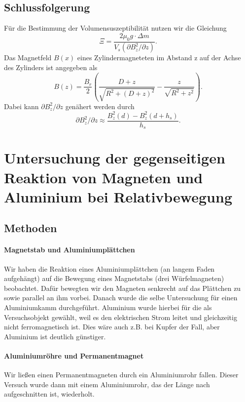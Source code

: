 \documentclass[
	a4paper,
	12pt,
	pagesize,
	ngerman
]{scrartcl}
\begin{document}
	\subsection{Schlussfolgerung}
	Für die Bestimmung der Volumensuszeptibilität nutzen wir die Gleichung
	\begin{equation}
	\label{Suzeptibilitaet}
	\Xi=\frac{2 \mu_0 g \cdot \Delta m}{V_s(\partial B_z^2 /\partial z)}.
	\end{equation}
	Das Magnetfeld $B(x)$ eines Zylindermagneteten im Abstand z auf der Achse des Zylinders ist angegeben als
	\begin{equation}
	\label{Magnetfeld_Zylinder}
	B(z)=\frac{B_r}{2}\left( \frac{D+z}{\sqrt{R^2+(D+z)^2}}-\frac{z}{\sqrt{R^2 +z^2}}\right).
	\end{equation}
	Dabei kann $\partial B_z^2 /\partial z$ genähert werden durch 
	\begin{equation}
	\label{Ableitung_Magnetfeld}
	\partial B_z^2 /\partial z \approx \frac{B_z^2(d) - B_z^2(d+h_s)}{h_s}.
	\end{equation}
	
	\section{Untersuchung der gegenseitigen Reaktion von Magneten und Aluminium bei Relativbewegung}
	\subsection{Methoden}
	\paragraph{Magnetstab und Aluminiumplättchen}
	Wir haben die Reaktion eines Aluminiumplättchen (an langem Faden aufgehängt) auf die Bewegung eines Magnetstabs (drei Würfelmagneten) beobachtet. Dafür bewegten wir den Magneten senkrecht auf das Plättchen zu sowie parallel an ihm vorbei.
	Danach wurde die selbe Untersuchung für einen Aluminiumkamm durchgeführt. Aluminium wurde hierbei für die als Versuchsobjekt gewählt, weil es den elektrischen Strom leitet und gleichzeitig nicht ferromagnetisch ist. Dies wäre auch z.B. bei Kupfer der Fall, aber Aluminium ist deutlich günstiger. %
	\paragraph{Aluminiumröhre und Permanentmagnet}
	Wir ließen einen Permanentmagneten durch ein Aluminiumrohr fallen. Dieser Versuch wurde dann mit einem Aluminiumrohr, das der Länge nach aufgeschnitten ist, wiederholt.
\end{document}
